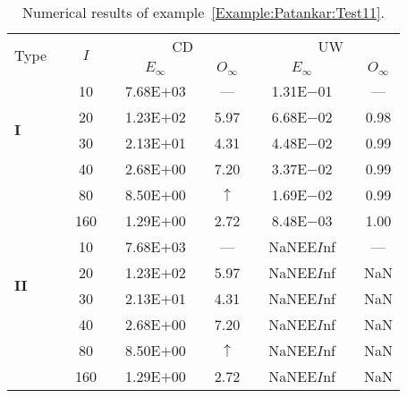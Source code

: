 {\renewcommand{\baselinestretch}{1.0}
\begin{table}[H]
\caption{Numerical results of example~\ref{Example:Patankar:Test11}.}

\setlength{\tabcolsep}{5pt}
\centering
\begin{tabular}{@{}l c c c c c c c c c c@{}}
\toprule
\multirow{2}{*}{Type} &  & \multirow{2}{*}{$I$} &  & \multicolumn{3}{c}{CD} &  & \multicolumn{3}{c}{UW} \\
\cline{5-7}
\cline{9-11}
 & & & & $E_{\infty}$ & & $O_{\infty}$ & & $E_{\infty}$ & & $O_{\infty}$\\
\midrule
\multirow{4}{*}{\textbf{I}} 
 & & 10 & & 7.68E$+$03 & & --- & & 1.31E$-$01 & & ---\\
 & & 20 & & 1.23E$+$02 & & 5.97 & & 6.68E$-$02 & & 0.98\\
 & & 30 & & 2.13E$+$01 & & 4.31 & & 4.48E$-$02 & & 0.99\\
 & & 40 & & 2.68E$+$00 & & 7.20 & & 3.37E$-$02 & & 0.99\\
 & & 80 & & 8.50E$+$00 & & $\uparrow$ & & 1.69E$-$02 & & 0.99\\
 & & 160 & & 1.29E$+$00 & & 2.72 & & 8.48E$-$03 & & 1.00\\
\midrule
\multirow{4}{*}{\textbf{II}} 
 & & 10 & & 7.68E$+$03 & & --- & & NaNEE$I$nf & & ---\\
 & & 20 & & 1.23E$+$02 & & 5.97 & & NaNEE$I$nf & & NaN\\
 & & 30 & & 2.13E$+$01 & & 4.31 & & NaNEE$I$nf & & NaN\\
 & & 40 & & 2.68E$+$00 & & 7.20 & & NaNEE$I$nf & & NaN\\
 & & 80 & & 8.50E$+$00 & & $\uparrow$ & & NaNEE$I$nf & & NaN\\
 & & 160 & & 1.29E$+$00 & & 2.72 & & NaNEE$I$nf & & NaN\\
\bottomrule
\end{tabular}
\label{Table:Patankar:Test11}
\end{table}}
